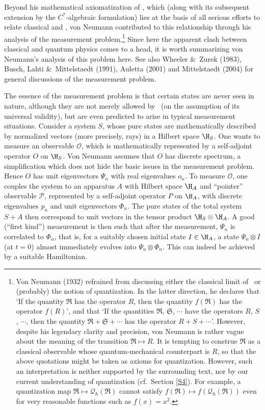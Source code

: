 \documentclass[12pt,titlepage]{article}
\newcommand{\ca}{$C^*$-algebra} \newcommand{\jba}{JB-algebra}
\newcommand{\ot}{\otimes}
\newcommand{\qh}{q_{\hbar}} \newcommand{\sgh}{\sigma_{\hbar}}
\newcommand{\CQ}{{\mathcal Q}} \newcommand{\CR}{{\mathcal R}}
\renewcommand{\qh}{\CQ_{\hbar}}
\begin{document}
Beyond his mathematical axiomatization of \qm, which (along with its subsequent extension by the \ca ic formulation)  lies at the basis of all serious efforts to relate classical and \qm, von Neumann contributed to this relationship through his  analysis of the measurement problem.\footnote{Von Neumann (1932) refrained from discussing either the classical limit of \qm\ or (probably) the notion of quantization.
In the latter direction, he declares that `If the quantity $\mathfrak{R}$ has the operator $R$, then the quantity $f(\mathfrak{R})$ has the operator $f(R)$', and that `If the quantities $\mathfrak{R}$, $\mathfrak{S}$, $\cdots$ have the operators $R$, $S$, $\cdots$, then the quantity $\mathfrak{R}+\mathfrak{S}+\cdots$ has the operator $R+S+\cdots$'.
However, despite his legendary clarity and precision, von Neumann is rather vague about the meaning of the transition $\mathfrak{R}\mapsto R$. It is tempting to construe
 $\mathfrak{R}$  as a classical observable whose quantum-mechanical counterpart is $R$, so that the above quotations might be taken as axioms for quantization. However, 
such an interpretation is neither supported by the surrounding text, nor by our current understanding of quantization (cf.\ Section \ref{S4}). For example, a quantization map $\mathfrak{R}\mapsto \qh(\mathfrak{R})$ cannot satisfy $f(\mathfrak{R})\mapsto f(\qh(\mathfrak{R}))$ even for very reasonable functions such as $f(x)=x^2$.}    Since here the apparent clash between classical and quantum physics comes to a head, it is worth summarizing von Neumann's analysis of this problem here. See also Wheeler \&\ Zurek (1983), Busch, Lahti \&\ Mittelstaedt (1991), Auletta (2001) and Mittelstaedt (2004) for general discussions of the measurement problem.

  The essence of the measurement problem is that certain states are never seen in nature, although they are not merely allowed by \qm\ (on the assumption of its universal validity), but are even predicted to arise in typical measurement situations. Consider a system $S$, whose pure states are mathematically described by normalized vectors (more precisely, rays) in a Hilbert space $\H_S$. One wants to measure an observable $\mathcal{O}$, which is mathematically represented by a self-adjoint operator $O$ on $\H_S$. Von Neumann assumes that $O$ has discrete spectrum,
a simplification which does not hide the basic issues in the measurement
problem. Hence $O$ has unit eigenvectors $\Psi_n$ with real eigenvalues $o_n$. 
To measure $\mathcal{O}$, one couples the system to an apparatus $A$ with
Hilbert space $\H_A$ and ``pointer'' observable $\mathcal{P}$, represented
by a self-adjoint operator $P$ on $\H_A$, with discrete eigenvalues
$p_n$ and unit eigenvectors $\Phi_n$. The pure states of the total system $S+A$ then correspond to unit vectors in the tensor product $\H_S\otimes \H_A$.  A good (``first kind'') measurement is then such that after the measurement, $\Psi_n$ is correlated to $\Phi_n$, that is, for a suitably chosen initial state $I \in{\H}_A$, a state
 $\Psi_n\ot I$ (at $t=0$) almost immediately evolves into $\Psi_n\ot\Phi_n$. This can indeed be achieved by a suitable Hamiltonian. 
\end{document}
